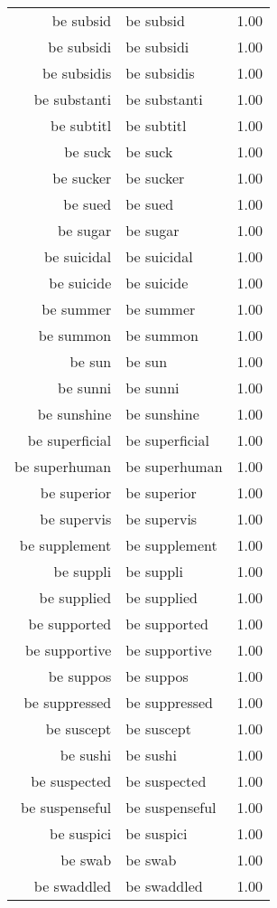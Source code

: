 \begin{table}[ht]
\begin{tabular}{rlr}
  be subsid & be subsid & 1.00 \\ 
  be subsidi & be subsidi & 1.00 \\ 
  be subsidis & be subsidis & 1.00 \\ 
  be substanti & be substanti & 1.00 \\ 
  be subtitl & be subtitl & 1.00 \\ 
  be suck & be suck & 1.00 \\ 
  be sucker & be sucker & 1.00 \\ 
  be sued & be sued & 1.00 \\ 
  be sugar & be sugar & 1.00 \\ 
  be suicidal & be suicidal & 1.00 \\ 
  be suicide & be suicide & 1.00 \\ 
  be summer & be summer & 1.00 \\ 
  be summon & be summon & 1.00 \\ 
  be sun & be sun & 1.00 \\ 
  be sunni & be sunni & 1.00 \\ 
  be sunshine & be sunshine & 1.00 \\ 
  be superficial & be superficial & 1.00 \\ 
  be superhuman & be superhuman & 1.00 \\ 
  be superior & be superior & 1.00 \\ 
  be supervis & be supervis & 1.00 \\ 
  be supplement & be supplement & 1.00 \\ 
  be suppli & be suppli & 1.00 \\ 
  be supplied & be supplied & 1.00 \\ 
  be supported & be supported & 1.00 \\ 
  be supportive & be supportive & 1.00 \\ 
  be suppos & be suppos & 1.00 \\ 
  be suppressed & be suppressed & 1.00 \\ 
  be suscept & be suscept & 1.00 \\ 
  be sushi & be sushi & 1.00 \\ 
  be suspected & be suspected & 1.00 \\ 
  be suspenseful & be suspenseful & 1.00 \\ 
  be suspici & be suspici & 1.00 \\ 
  be swab & be swab & 1.00 \\ 
  be swaddled & be swaddled & 1.00 \\ 

\end{tabular}
\end{table}
